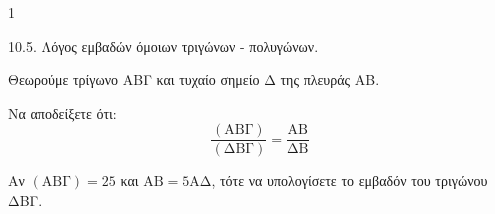\begin{ylh}{1}
    \item 10.5. Λόγος εμβαδών όμοιων τριγώνων - πολυγώνων.
\end{ylh}
\begin{figure} %
    \centering
\end{figure}
Θεωρούμε τρίγωνο ΑΒΓ και τυχαίο σημείο Δ της πλευράς ΑΒ.
\begin{alist}
\item Να αποδείξετε ότι:
\[ \frac{(\text{ΑΒΓ})}{(\text{ΔΒΓ})} = \frac{\text{ΑΒ}}{\text{ΔΒ}} \] 
\item Αν $(\text{ΑΒΓ}) = 25$ και $\text{ΑΒ} = 5\text{ΑΔ}$, τότε να υπολογίσετε το εμβαδόν του τριγώνου ΔΒΓ. 
\end{alist}